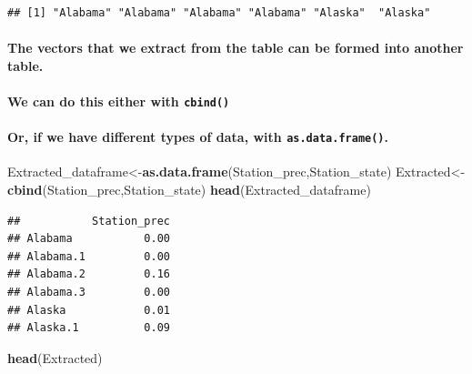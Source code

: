 \documentclass[
]{article}
\newenvironment{Shaded}{\begin{snugshade}}{\end{snugshade}}
\newcommand{\KeywordTok}[1]{\textcolor[rgb]{0.13,0.29,0.53}{\textbf{#1}}}
\newcommand{\NormalTok}[1]{#1}
\let\oldparagraph\paragraph
\renewcommand{\paragraph}[1]{\oldparagraph{#1}\mbox{}}
\begin{document}
\begin{verbatim}
## [1] "Alabama" "Alabama" "Alabama" "Alabama" "Alaska"  "Alaska"
\end{verbatim}

\hypertarget{the-vectors-that-we-extract-from-the-table-can-be-formed-into-another-table.}{%
\paragraph{The vectors that we extract from the table can be formed into
another
table.}\label{the-vectors-that-we-extract-from-the-table-can-be-formed-into-another-table.}}

\hypertarget{we-can-do-this-either-with-cbind}{%
\paragraph{\texorpdfstring{We can do this either with
\texttt{cbind()}}{We can do this either with cbind()}}\label{we-can-do-this-either-with-cbind}}

\hypertarget{or-if-we-have-different-types-of-data-with-as.data.frame.}{%
\paragraph{\texorpdfstring{Or, if we have different types of data, with
\texttt{as.data.frame()}.}{Or, if we have different types of data, with as.data.frame().}}\label{or-if-we-have-different-types-of-data-with-as.data.frame.}}

\begin{Shaded}
\begin{Highlighting}[]
\NormalTok{Extracted_dataframe<-}\KeywordTok{as.data.frame}\NormalTok{(Station_prec,Station_state)}
\NormalTok{Extracted<-}\KeywordTok{cbind}\NormalTok{(Station_prec,Station_state)}
\KeywordTok{head}\NormalTok{(Extracted_dataframe)}
\end{Highlighting}
\end{Shaded}

\begin{verbatim}
##           Station_prec
## Alabama           0.00
## Alabama.1         0.00
## Alabama.2         0.16
## Alabama.3         0.00
## Alaska            0.01
## Alaska.1          0.09
\end{verbatim}

\begin{Shaded}
\begin{Highlighting}[]
\KeywordTok{head}\NormalTok{(Extracted)}
\end{Highlighting}
\end{Shaded}
\end{document}

